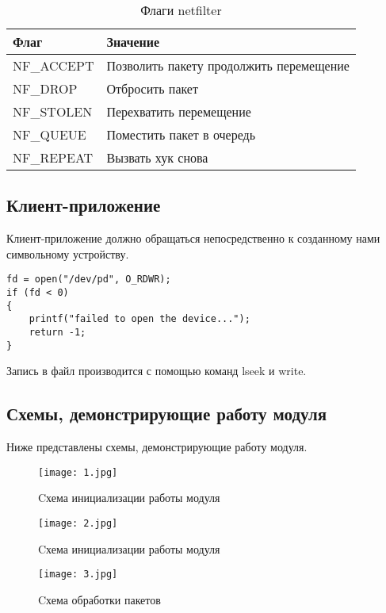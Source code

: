 \begin{table}[h!]
	\caption{Флаги netfilter}
	\begin{tabular}{|p{5cm}|p{11.7cm}|}
		\hline
		Флаг & Значение \\
		\hline
		NF\_ACCEPT & Позволить пакету продолжить перемещение\\
		\hline
		NF\_DROP & Отбросить пакет \\
		\hline
		NF\_STOLEN & Перехватить перемещение \\
		\hline
		NF\_QUEUE & Поместить пакет в очередь \\
		\hline
		NF\_REPEAT & Вызвать хук снова \\
		\hline
	\end{tabular}
\end{table}


\subsection*{Клиент-приложение}

Клиент-приложение должно обращаться непосредственно к созданному нами символьному устройству.

\begin{lstlisting}
fd = open("/dev/pd", O_RDWR);
if (fd < 0)
{
	printf("failed to open the device...");
	return -1;
}
\end{lstlisting}

Запись в файл производится с помощью команд lseek и write.

\newpage
\subsection*{Схемы, демонстрирующие работу модуля}
Ниже представлены схемы, демонстрирующие работу модуля.

\begin{figure}[h!]\center 
	\caption{Cхема инициализации работы модуля}
	\texttt{[image: 1.jpg]}
\end{figure}

\newpage
\begin{figure}[h!]\center 
	\caption{Cхема инициализации работы модуля}
	\texttt{[image: 2.jpg]}
\end{figure}

\newpage
\begin{figure}[h!]\center 
	\caption{Cхема обработки пакетов}
	\texttt{[image: 3.jpg]}
\end{figure}


